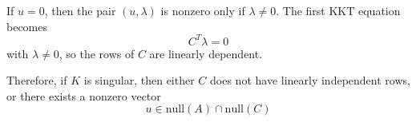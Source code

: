 If \(u=0\), then the pair \((u,\lambda)\) is nonzero only if \(\lambda\ne 0\). The first KKT equation becomes
\[
C^T\lambda=0
\]
with \(\lambda\ne 0\), so the rows of \(C\) are linearly dependent.

Therefore, if \(K\) is singular, then either \(C\) does not have linearly independent rows, or there exists a nonzero vector
\[
u\in\mathrm{null}(A)\cap\mathrm{null}(C)
\]
